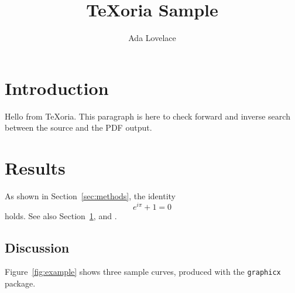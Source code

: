 \documentclass[11pt]{article}
\title{TeXoria Sample}
\author{Ada Lovelace}
\begin{document}
\maketitle

\section{Introduction}
\label{sec:intro}
Hello from TeXoria. This paragraph is here to check forward and inverse
search between the source and the PDF output.



\section{Results}
\label{sec:results}
As shown in Section~\ref{sec:methods}, the identity
\begin{equation}
  e^{i\pi} + 1 = 0
  \label{eq:euler}
\end{equation}
holds. See also Section~\ref{sec:intro}, \cite{knuth1984} and \cite{lamport1986}.

\subsection{Discussion}
Figure~\ref{fig:example} shows three sample curves, produced with the
\texttt{graphicx} package.



\end{document}
